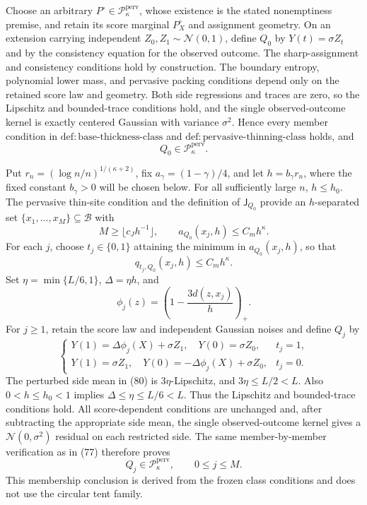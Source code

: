 Choose an arbitrary \(P^\circ\in\mathcal P_{\kappa}^{\mathrm{perv}}\), whose existence is the stated nonemptiness premise, and retain its score marginal \(P_X^\circ\) and assignment geometry. On an extension carrying independent \(Z_0,Z_1\sim\mathcal N(0,1)\), define \(Q_0\) by \(Y(t)=\sigma Z_t\) and by the consistency equation for the observed outcome. The sharp-assignment and consistency conditions hold by construction. The boundary entropy, polynomial lower mass, and pervasive packing conditions depend only on the retained score law and geometry. Both side regressions and traces are zero, so the Lipschitz and bounded-trace conditions hold, and the single observed-outcome kernel is exactly centered Gaussian with variance \(\sigma^2\). Hence every member condition in \(\mathrm{def:base\text{-}thickness\text{-}class}\) and \(\mathrm{def:pervasive\text{-}thinning\text{-}class}\) holds, and
\[
 Q_0\in\mathcal P_{\kappa}^{\mathrm{perv}}. \tag{77}
\]

Put \(r_n=(\log n/n)^{1/(\kappa+2)}\), fix \(a_\gamma=(1-\gamma)/4\), and let \(h=b_\gamma r_n\), where the fixed constant \(b_\gamma>0\) will be chosen below. For all sufficiently large \(n\), \(h\le h_0\). The pervasive thin-site condition and the definition of \(\mathsf J_{Q_0}\) provide an \(h\)-separated set \(\{x_1,\ldots,x_M\}\subseteq\mathcal B\) with
\[
 M\ge\lfloor c_Jh^{-1}\rfloor,
 \qquad
 a_{Q_0}(x_j,h)\le C_mh^\kappa. \tag{78}
\]
For each \(j\), choose \(t_j\in\{0,1\}\) attaining the minimum in \(a_{Q_0}(x_j,h)\), so that
\[
 q_{t_j,Q_0}(x_j,h)\le C_mh^\kappa. \tag{79}
\]
Set \(\eta=\min\{L/6,1\}\), \(\Delta=\eta h\), and
\[
 \phi_j(z)=\left(1-\frac{3d(z,x_j)}h\right)_+.
\]
For \(j\ge1\), retain the score law and independent Gaussian noises and define \(Q_j\) by
\[
 \begin{cases}
 Y(1)=\Delta\phi_j(X)+\sigma Z_1,\quad Y(0)=\sigma Z_0,&t_j=1,\\
 Y(1)=\sigma Z_1,\quad Y(0)=-\Delta\phi_j(X)+\sigma Z_0,&t_j=0.
 \end{cases} \tag{80}
\]
The perturbed side mean in (80) is \(3\eta\)-Lipschitz, and \(3\eta\le L/2<L\). Also \(0<h\le h_0<1\) implies \(\Delta\le\eta\le L/6<L\). Thus the Lipschitz and bounded-trace conditions hold. All score-dependent conditions are unchanged and, after subtracting the appropriate side mean, the single observed-outcome kernel gives a \(\mathcal N(0,\sigma^2)\) residual on each restricted side. The same member-by-member verification as in (77) therefore proves
\[
 Q_j\in\mathcal P_{\kappa}^{\mathrm{perv}},\qquad 0\le j\le M. \tag{81}
\]
This membership conclusion is derived from the frozen class conditions and does not use the circular tent family.

